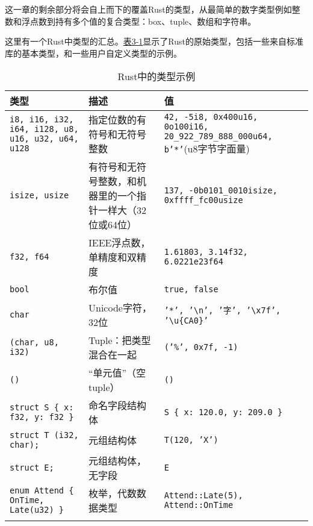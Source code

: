 这一章的剩余部分将会自上而下的覆盖Rust的类型，从最简单的数字类型例如整数和浮点数到持有多个值的复合类型：box、tuple、数组和字符串。

这里有一个Rust中类型的汇总。\hyperref[t3-1]{表3-1}显示了Rust的原始类型，包括一些来自标准库的基本类型，和一些用户自定义类型的示例。

\begin{longtable}{p{}p{}p{}}
    \caption{Rust中的类型示例}
    \label{t3-1}\\
    \hline
    \textbf{类型}   & \textbf{描述}    & \textbf{值}    \\
    \hline
    \texttt{i8, i16, i32, i64, i128, u8, u16, u32, u64, u128}    & 指定位数的有符号和无符号整数 & \texttt{42, -5i8, 0x400u16, 0o100i16, 20\_922\_789\_888\_000u64, b'*'}(u8字节字面量)  \\
    \rowcolor{tablecolor}
    \texttt{isize, usize}   & 有符号和无符号整数，和机器里的一个指针一样大（32位或64位）   & \texttt{137, -0b0101\_0010isize, 0xffff\_fc00usize} \\
    \texttt{f32, f64}       & IEEE浮点数，单精度和双精度                                & \texttt{1.61803, 3.14f32, 6.0221e23f64} \\
    \rowcolor{tablecolor}
    \texttt{bool}           & 布尔值            & \texttt{true, false} \\
    \texttt{char}           & Unicode字符，32位 & \texttt{'*', '\textbackslash n', '字', '\textbackslash x7f', '\textbackslash u\{CA0\}'} \\
    \rowcolor{tablecolor}
    \texttt{(char, u8, i32)}                        & Tuple：把类型混合在一起   & \texttt{('\%', 0x7f, -1)} \\
    \texttt{()}                                     & “单元值”（空tuple）      & \texttt{()} \\
    \rowcolor{tablecolor}
    \texttt{struct S \{ x: f32, y: f32 \}}          & 命名字段结构体            & \texttt{S \{ x: 120.0, y: 209.0 \}} \\
    \texttt{struct T (i32, char);}                  & 元组结构体                & \texttt{T(120, 'X')} \\
    \rowcolor{tablecolor}
    \texttt{struct E;}                              & 元组结构体，无字段        & \texttt{E} \\
    \texttt{enum Attend \{ OnTime, Late(u32) \}}    & 枚举，代数数据类型        & \texttt{Attend::Late(5), Attend::OnTime} \\
    \rowcolor{tablecolor}

\end{longtable}
